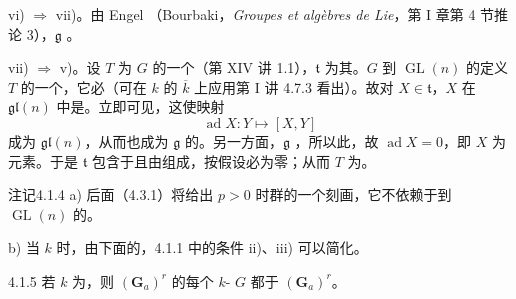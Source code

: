 vi) $\Rightarrow$ vii)。由 Engel （Bourbaki，\textit{Groupes et algèbres de Lie}，第 I 章第 4 节推论 3），$\mathfrak g$ 。

vii) $\Rightarrow$ v)。设 $T$ 为 $G$ 的一个（第 XIV 讲 1.1），$\mathfrak t$ 为其。$G$ 到 $\operatorname{GL}(n)$ 的定义 $T$ 的一个，它必（可在 $k$ 的 $\overline k$ 上应用第 I 讲 4.7.3 看出）。故对 $X\in\mathfrak t$，$X$ 在 $\mathfrak{gl}(n)$ 中是。立即可见，这使映射
\[\operatorname{ad}X:Y\longmapsto[X,Y]\]
成为 $\mathfrak{gl}(n)$，从而也成为 $\mathfrak g$ 的。另一方面，$\mathfrak g$ ，所以此，故 $\operatorname{ad}X=0$，即 $X$ 为元素。于是 $\mathfrak t$ 包含于且由组成，按假设必为零；从而 $T$ 为。
\begin{SGAresult}{注记}{4.1.4}
a) 后面（4.3.1）将给出 $p>0$ 时群的一个刻画，它不依赖于到 $\operatorname{GL}(n)$ 的。

b) 当 $k$ 时，由下面的，4.1.1 中的条件 ii)、iii) 可以简化。
\end{SGAresult}
\begin{SGAresult}{}{4.1.5}
若 $k$ 为，则 $(\mathbf G_a)^r$ 的每个 $k$- $G$ 都于 $(\mathbf G_a)^r$。
\end{SGAresult}
